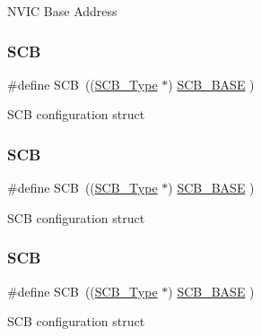 N\+V\+IC Base Address \mbox{\label{group___c_m_s_i_s__core__base_gaaaf6477c2bde2f00f99e3c2fd1060b01}} 
\subsubsection{\texorpdfstring{S\+CB}{SCB}\hspace{0.1cm}{\footnotesize\ttfamily [1/12]}}
{\footnotesize\ttfamily \#define S\+CB~((\hyperlink{struct_s_c_b___type}{S\+C\+B\+\_\+\+Type}       $\ast$)     \hyperlink{group___c_m_s_i_s__core__base_gad55a7ddb8d4b2398b0c1cfec76c0d9fd}{S\+C\+B\+\_\+\+B\+A\+SE}      )}

S\+CB configuration struct \mbox{\label{group___c_m_s_i_s__core__base_gaaaf6477c2bde2f00f99e3c2fd1060b01}} 
\subsubsection{\texorpdfstring{S\+CB}{SCB}\hspace{0.1cm}{\footnotesize\ttfamily [2/12]}}
{\footnotesize\ttfamily \#define S\+CB~((\hyperlink{struct_s_c_b___type}{S\+C\+B\+\_\+\+Type}       $\ast$)     \hyperlink{group___c_m_s_i_s__core__base_gad55a7ddb8d4b2398b0c1cfec76c0d9fd}{S\+C\+B\+\_\+\+B\+A\+SE}      )}

S\+CB configuration struct \mbox{\label{group___c_m_s_i_s__core__base_gaaaf6477c2bde2f00f99e3c2fd1060b01}} 
\subsubsection{\texorpdfstring{S\+CB}{SCB}\hspace{0.1cm}{\footnotesize\ttfamily [3/12]}}
{\footnotesize\ttfamily \#define S\+CB~((\hyperlink{struct_s_c_b___type}{S\+C\+B\+\_\+\+Type}       $\ast$)     \hyperlink{group___c_m_s_i_s__core__base_gad55a7ddb8d4b2398b0c1cfec76c0d9fd}{S\+C\+B\+\_\+\+B\+A\+SE}      )}

S\+CB configuration struct \mbox{\label{group___c_m_s_i_s__core__base_gaaaf6477c2bde2f00f99e3c2fd1060b01}} 
